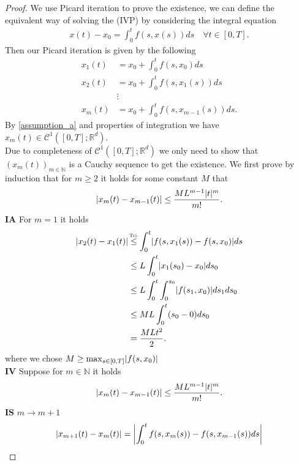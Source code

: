 \begin{proof}
 We use Picard iteration to prove the existence, we can define the equivalent way of solving the (IVP) by considering the integral equation
 \begin{align*}
   x(t) - x_{0} = \int_0^{t} f(s,x(s)) ds \quad \forall t \in  [0,T]
 .\end{align*}
 Then our Picard iteration is given by the following 
 \begin{align*}
   x_1(t) &= x_{0} + \int_0^{t} f(s,x_{0})  ds \\
   x_2(t) &= x_{0} + \int_0^{t} f(s,x_{1}(s))  ds \\
          &\vdots \\
   x_m(t) &= x_{0} + \int_0^{t} f(s,x_{m-1}(s))  ds
 .\end{align*}
 By \autoref{assumption_a} and properties of integration we have $x_m(t) \in  \mathcal{C}^{1}([0,T];\mathbb{R}^{d} ) $.\\[1ex]
 Due to completeness of $\mathcal{C}^{1}([0,T];\mathbb{R}^{d} )$ we only need to show that $(x_m(t))_{m \in  \mathbb{N}}$ is a Cauchy sequence 
 to get the existence. We first prove by induction that for $m\ge 2$ it holds for some constant $M$ that
 \begin{align*}
   \lvert x_m(t) - x_{m-1}(t)\rvert \le \frac{ML^{m-1}\lvert t\rvert^{m}  }{m!}
 .\end{align*}
 \textbf{IA} For $m=1$ it holds 
 \begin{align*}
   \abs{x_2(t) - x_{1}(t)} &\myS{Tri.}{\le } \int_0^{t}  \abs{f(s,x_{1}(s))-f(s,x_{0})}ds\\
                           &\le L \int_0^{t} \abs{x_{1}(s_{0})-x_{0}}  ds_{0}\\
                           &\le L \int_0^{t} \int_0^{s_{0}}   \abs{f(s_{1},x_{0})}ds_{1}ds_{0}\\
                           &\le ML \int_0^{t}(s_{0}-0)  ds_{0} \\
                           &= \frac{MLt^2}{2}
 .\end{align*}
 where we chose $M \ge  \max_{s \in  [0,T]} \lvert f(s,x_{0})\rvert$ \\
 \textbf{IV} Suppose for $m \in  \mathbb{N}$ it holds 
 \begin{align*}
   \lvert x_m(t)-x_{m-1}(t)\rvert \le  \frac{ML^{m-1}\lvert t\rvert^m }{m!}
 .\end{align*}
 \textbf{IS} $m \to  m+1$ 
 \begin{align*}
   \abs{x_{m+1}(t)-x_m(t)}&= \abs*{\int_0^{t} f(s,x_m(s)) - f(s,x_{m-1}(s)) ds }\\

\end{align*}
\end{proof}

